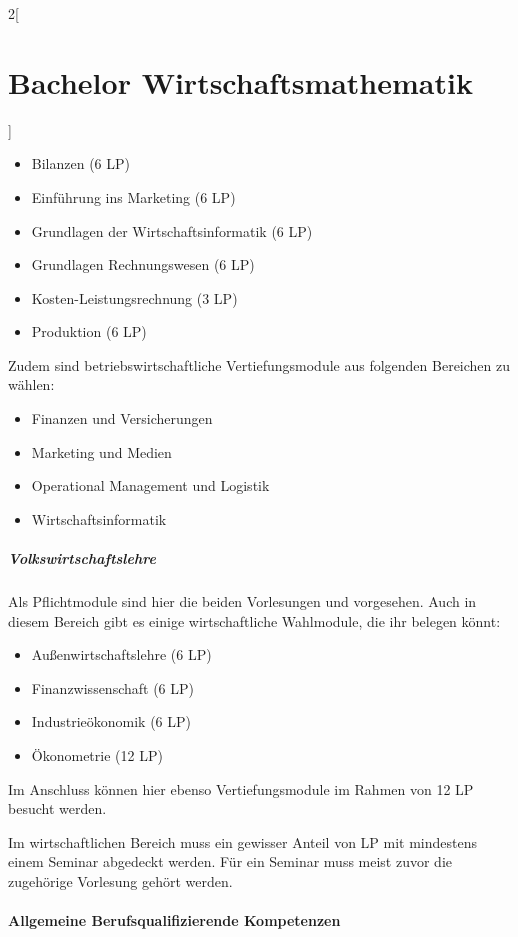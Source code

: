 \begin{multicols}{2}[\section{Bachelor Wirtschaftsmathematik}]
\begin{itemize}\itemsep 0pt
    \item Bilanzen (6 LP)
    \item Einführung ins Marketing (6 LP)
    \item Grundlagen der Wirtschaftsinformatik (6 LP)
    \item Grundlagen Rechnungswesen (6 LP)
    \item Kosten-Leistungsrechnung (3 LP)
    \item Produktion (6 LP)
\end{itemize}

Zudem sind betriebswirtschaftliche Vertiefungsmodule aus folgenden Bereichen zu
wählen: 

\begin{itemize}\itemsep 0pt
    \item Finanzen und Versicherungen
    \item Marketing und Medien
    \item Operational Management und Logistik
    \item Wirtschaftsinformatik
\end{itemize}

\subparagraph{Volkswirtschaftslehre}

Als Pflichtmodule sind hier die beiden Vorlesungen  und
 vorgesehen. Auch in diesem Bereich gibt es einige
wirtschaftliche Wahlmodule, die ihr belegen könnt:

\begin{itemize}\itemsep 0pt
    \item Außenwirtschaftslehre (6 LP)
    \item Finanzwissenschaft (6 LP)
    \item Industrieökonomik (6 LP)
    \item Ökonometrie (12 LP)
\end{itemize}

Im Anschluss können hier ebenso Vertiefungsmodule im Rahmen von 12 LP besucht
werden.

Im wirtschaftlichen Bereich muss ein gewisser Anteil von LP mit mindestens
einem Seminar abgedeckt werden. Für ein Seminar muss meist zuvor die zugehörige
Vorlesung gehört werden.

\paragraph{Allgemeine Berufsqualifizierende Kompetenzen}


\end{multicols}
